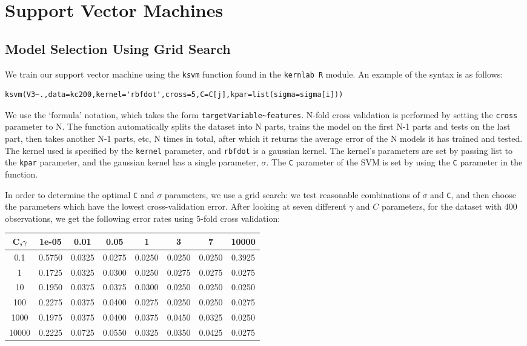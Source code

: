 \documentclass[11pt]{article}
\begin{document}
\section{Support Vector Machines}
\subsection{Model Selection Using Grid Search}
We train our support vector machine using the \texttt{ksvm} function found in the \texttt{kernlab R} module. An example of the syntax is as follows:
\begin{lstlisting}
ksvm(V3~.,data=kc200,kernel='rbfdot',cross=5,C=C[j],kpar=list(sigma=sigma[i]))
\end{lstlisting}
We use the `formula' notation, which takes the form \texttt{targetVariable\textasciitilde features}. N-fold cross validation is performed by setting the \texttt{cross} parameter to N. The function automatically splits the dataset into N parts, trains the model on the first N-1 parts and tests on the last part, then takes another N-1 parts, etc, N times in total, after which it returns the average error of the N models it has trained and tested. The kernel used is specified by the \texttt{kernel} parameter, and \texttt{rbfdot} is a gaussian kernel. The kernel's parameters are set by passing list to the \texttt{kpar} parameter, and the gaussian kernel has a single parameter, $\sigma$. The \texttt{C} parameter of the SVM is set by using the \texttt{C} parameter in the function.

In order to determine the optimal \texttt{C} and $\sigma$ parameters, we use a grid search: we test reasonable combinations of $\sigma$ and \texttt{C}, and then choose the parameters which have the lowest cross-validation error. After looking at seven different $\gamma$ and $C$ parameters, for the dataset with 400 observations, we get the following error rates using 5-fold cross validation:\\
\begin{tabular}{|c|c|c|c|c|c|c|c|}
\hline
C,$\gamma$&1e-05 & 0.01 & 0.05 & 1 & 3 & 7 & 10000\\\hline
0.1&0.5750&0.0325&0.0275&0.0250&0.0250&0.0250&0.3925\\\hline
1 & 0.1725 & 0.0325 & 0.0300 & 0.0250&0.0275&0.0275&0.0275\\\hline
10&0.1950&0.0375&0.0375&0.0300&0.0250&0.0250&0.0250\\\hline
100&0.2275&0.0375&0.0400&0.0275&0.0250&0.0250&0.0275\\\hline
1000&0.1975&0.0375&0.0400&0.0375&0.0450&0.0325&0.0250\\\hline
10000&0.2225&0.0725&0.0550&0.0325&0.0350&0.0425&0.0275\\\hline
\end{tabular}
\end{document}
